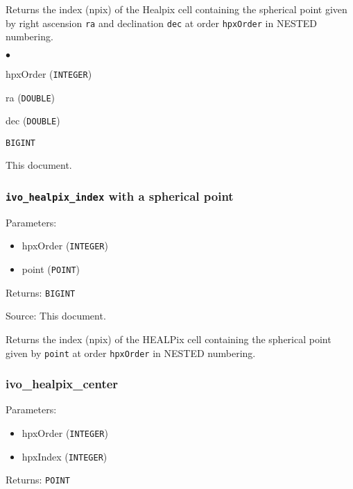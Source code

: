 \documentclass[11pt,a4paper]{ivoa}
\newenvironment{parameters}%
  {\hfil %
    \begin{list}{$\bullet$}{\topsep=0pt\partopsep=0pt\parsep=0pt}
    }%
  {\end{list}}
\begin{document}
Returns the index (npix) of the Healpix cell containing the spherical
point given by right ascension \texttt{ra} and declination \texttt{dec}
at order \texttt{hpxOrder} in NESTED numbering.

\begin{description}
\item[Parameters]

\begin{parameters}
	\item hpxOrder (\texttt{INTEGER})
	\item ra (\texttt{DOUBLE})
	\item dec (\texttt{DOUBLE})
\end{parameters}

\item[Return type] \texttt{BIGINT}

\item[Source] This document.
\end{description}

\subsubsection{\texttt{ivo\_healpix\_index} with a spherical point}

Parameters:

\begin{itemize}
	\item hpxOrder (\texttt{INTEGER})
	\item point (\texttt{POINT})
\end{itemize}

Returns: \texttt{BIGINT}

Source: This document.

Returns the index (npix) of the HEALPix cell containing the spherical
point given by \texttt{point} at order \texttt{hpxOrder} in NESTED
numbering.


\subsubsection{ivo\_healpix\_center}

Parameters:

\begin{itemize}
	\item hpxOrder (\texttt{INTEGER})
	\item hpxIndex (\texttt{INTEGER})
\end{itemize}

Returns: \texttt{POINT}
\end{document}
